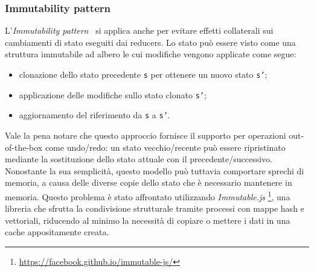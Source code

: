 \subsubsection*{Immutability pattern}
L'\emph{Immutability pattern}~\cite{immutability} si applica anche per evitare effetti collaterali sui cambiamenti di stato
eseguiti dai reducers. Lo stato può essere visto come una struttura immutabile ad albero le cui modifiche vengono applicate come segue:
\begin{itemize}
  \item clonazione dello stato precedente \texttt{s} per ottenere un nuovo stato \texttt{s'};
  \item applicazione delle modifiche sullo stato clonato \texttt{s'};
  \item aggiornamento del riferimento da \texttt{s} a \texttt{s'}.
\end{itemize}
Vale la pena notare che questo approccio fornisce il supporto per operazioni out-of-the-box come undo/redo:
un stato vecchio/recente può essere ripristinato mediante la sostituzione dello stato attuale con il precedente/successivo.
Nonostante la sua semplicità, questo modello può tuttavia comportare sprechi di memoria, a causa delle diverse copie dello
stato che è necessario mantenere in memoria. Questo problema è stato affrontato utilizzando \emph{Immutable.js}
\footnote{\url{https://facebook.github.io/immutable-js/}}, una libreria che sfrutta la condivisione strutturale tramite
processi con mappe hash e vettoriali, riducendo al minimo la necessità di copiare o mettere i dati in una cache appositamente creata.
\newpage

